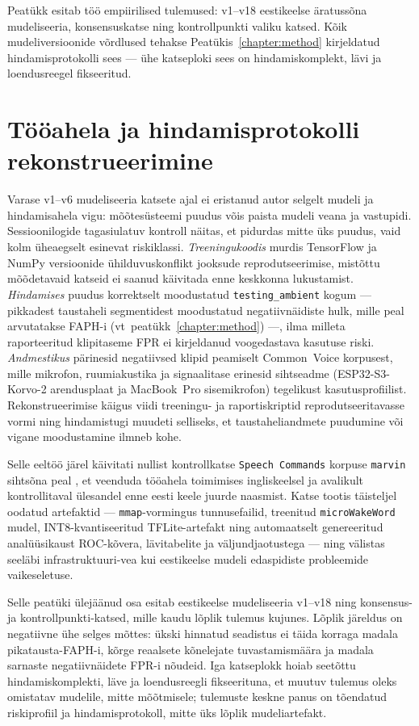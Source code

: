 Peatükk esitab töö empiirilised tulemused: v1--v18 eestikeelse äratussõna mudeliseeria, konsensuskatse ning kontrollpunkti valiku katsed. Kõik mudeliversioonide võrdlused tehakse Peatükis~\ref{chapter:method} kirjeldatud hindamisprotokolli sees --- ühe katseploki sees on hindamiskomplekt, lävi ja loendusreegel fikseeritud.

\section{Tööahela ja hindamisprotokolli rekonstrueerimine}
\label{sec:pipeline-reconstruction}
Varase v1--v6 mudeliseeria katsete ajal ei eristanud autor selgelt mudeli ja hindamisahela vigu: mõõtesüsteemi puudus võis paista mudeli veana ja vastupidi. Sessioonilogide tagasiulatuv kontroll näitas, et pidurdas mitte üks puudus, vaid kolm üheaegselt esinevat riskiklassi. \emph{Treeningukoodis} murdis TensorFlow ja NumPy versioonide ühilduvuskonflikt jooksude reprodutseerimise, mistõttu mõõdetavaid katseid ei saanud käivitada enne keskkonna lukustamist. \emph{Hindamises} puudus korrektselt moodustatud \texttt{testing\_ambient} kogum --- pikkadest taustaheli segmentidest moodustatud negatiivnäidiste hulk, mille peal arvutatakse FAPH-i (vt~peatükk~\ref{chapter:method}) ---, ilma milleta raporteeritud klipitaseme FPR ei kirjeldanud voogedastava kasutuse riski. \emph{Andmestikus} pärinesid negatiivsed klipid peamiselt Common~Voice korpusest, mille mikrofon, ruumiakustika ja signaalitase erinesid sihtseadme (ESP32-S3-Korvo-2 arendusplaat ja MacBook~Pro sisemikrofon) tegelikust kasutusprofiilist. Rekonstrueerimise käigus viidi treeningu- ja raportiskriptid reprodutseeritavasse vormi ning hindamistugi muudeti selliseks, et taustaheliandmete puudumine või vigane moodustamine ilmneb kohe.

Selle eeltöö järel käivitati nullist kontrollkatse \texttt{Speech Commands} korpuse \texttt{marvin} sihtsõna peal \cite{speechcommands2018}, et veenduda tööahela toimimises ingliskeelsel ja avalikult kontrollitaval ülesandel enne eesti keele juurde naasmist. Katse tootis täisteljel oodatud artefaktid --- \texttt{mmap}-vormingus tunnusefailid, treenitud \texttt{microWakeWord} mudel, INT8-kvantiseeritud TFLite-artefakt ning automaatselt genereeritud analüüsikaust ROC-kõvera, lävitabelite ja väljundjaotustega --- ning välistas seeläbi infrastruktuuri-vea kui eestikeelse mudeli edaspidiste probleemide vaikeseletuse.

Selle peatüki ülejäänud osa esitab eestikeelse mudeliseeria v1--v18 ning konsensus- ja kontrollpunkti-katsed, mille kaudu lõplik tulemus kujunes. Lõplik järeldus on negatiivne ühe selges mõttes: ükski hinnatud seadistus ei täida korraga madala pikatausta-FAPH-i, kõrge reaalsete kõnelejate tuvastamismäära ja madala sarnaste negatiivnäidete FPR-i nõudeid. Iga katseplokk hoiab seetõttu hindamiskomplekti, läve ja loendusreegli fikseerituna, et muutuv tulemus oleks omistatav mudelile, mitte mõõtmisele; tulemuste keskne panus on tõendatud riskiprofiil ja hindamisprotokoll, mitte üks lõplik mudeliartefakt.

